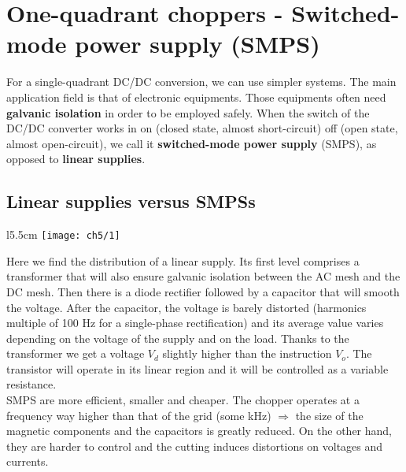 
\chapter{One-quadrant choppers - Switched-mode power supply (SMPS)}	
    For a single-quadrant DC/DC conversion, we can use simpler systems. The main application field is that of electronic equipments. Those equipments often need \textbf{galvanic isolation} in order to be employed safely. When the switch of the DC/DC converter works in on (closed state, almost short-circuit) off (open state, almost open-circuit), we call it \textbf{switched-mode power supply} (SMPS), as opposed to \textbf{linear supplies}.
	
	\section{Linear supplies versus SMPSs}
		\begin{wrapfigure}[12]{l}{5.5cm}
		\vspace{-5mm}
		\texttt{[image: ch5/1]}
		\end{wrapfigure}
		Here we find the distribution of a linear supply. Its first level comprises a transformer that will also ensure galvanic isolation between the AC mesh and the DC mesh. Then there is a diode rectifier followed by a capacitor that will smooth the voltage. After the capacitor, the voltage is barely distorted (harmonics multiple of 100 Hz for a single-phase rectification) and its average value varies depending on the voltage of the supply and on the load. Thanks to the transformer we get a voltage $V_d$ slightly higher than the instruction $V_o$. The transistor will operate in its linear region and it will be controlled as a variable resistance. \\
		
		SMPS are more efficient, smaller and cheaper. The chopper operates at a frequency way higher than that of the grid (some kHz) $\Rightarrow$ the size of the magnetic components and the capacitors is greatly reduced. On the other hand, they are harder to control and the cutting induces distortions on voltages and currents. 
		
